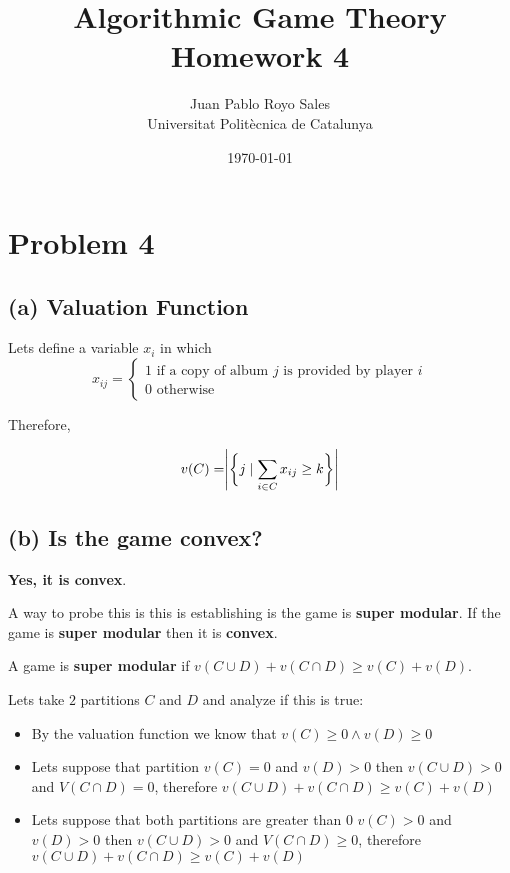 \documentclass[12pt, a4paper]{article}
\title{%
  Algorithmic Game Theory \\
  Homework 4
}
\author{%
  Juan Pablo Royo Sales\\
  \small{Universitat Politècnica de Catalunya}
}
\date\today
\begin{document}
\maketitle

\section{Problem 4}
\subsection{(a) Valuation Function}
Lets define a variable $x_i$ in which 
\[
x_{ij} = 
\begin{cases}
  1 \text{ if a copy of album } j \text{ is provided by player } i\\
  0 \text{ otherwise } 
\end{cases}
\]

Therefore, 

\begin{equation*}
  v(C) = \Biggr|\biggr\{j \mid \sum_{i \in C} x_{ij} \geq k \biggl\}\Biggl|\\
\end{equation*}

\subsection{(b) Is the game convex?}


\textbf{Yes, it is convex}.

A way to probe this is this is establishing is the game is \textbf{super modular}.
If the game is \textbf{super modular} then it is \textbf{convex}.

A game is \textbf{super modular} if $v(C \cup D) + v(C \cap D) \geq v(C) + v(D)$.

Lets take $2$ partitions $C$ and $D$ and analyze if this is true:

\begin{itemize}
  \item By the valuation function we know that $v(C) \geq 0 \land v(D) \geq 0$
  \item Lets suppose that partition $v(C) = 0$ and $v(D) > 0$ then $v(C \cup D) > 0$ and $V(C \cap D) = 0$, therefore $v(C \cup D) + v(C \cap D) \geq v(C) + v(D)$
  \item Lets suppose that both partitions are greater than 0 $v(C) > 0$ and $v(D) > 0$ then $v(C \cup D) > 0$ and $V(C \cap D) \geq 0$, therefore $v(C \cup D) + v(C \cap D) \geq v(C) + v(D)$ 
\end{itemize}
\end{document}
